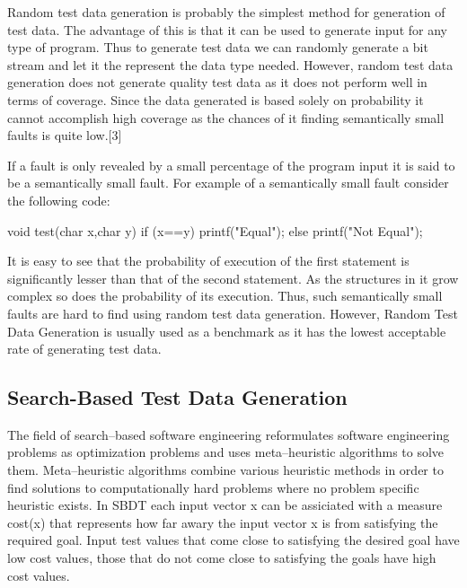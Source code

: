 Random test data generation is probably the simplest method for generation of test data. The advantage of this is that it can be used to generate input for any type of program. Thus to generate test data we can randomly generate a bit stream and let it the represent the data type needed. However, random test data generation does not generate quality test data as it does not perform well in terms of coverage. Since the data generated is based solely on probability it cannot accomplish high coverage as the chances of it finding semantically small faults is quite low.[3]

If a fault is only revealed by a small percentage of the program input it is said to be a semantically small fault. For example of a semantically small fault consider the following code:

void test(char x,char y) {
    if (x==y)
        printf("Equal");
    else
        printf("Not Equal");
}

It is easy to see that the probability of execution of the first statement is significantly lesser than that of the second statement. As the structures in it grow complex so does the probability of its execution. Thus, such semantically small faults are hard to find using random test data generation. However, Random Test Data Generation is usually used as a benchmark as it has the lowest acceptable rate of generating test data.

\subsection{Search-Based Test Data Generation}
The field of search–based software engineering reformulates software engineering problems as optimization problems and uses meta–heuristic algorithms to solve them. Meta–heuristic algorithms combine various heuristic methods in order to find solutions to computationally hard problems where no problem specific heuristic exists. In SBDT each input vector x can be assiciated with a measure cost(x) that represents how far awary the input vector x is from satisfying the required goal. Input test values that come close to satisfying the desired goal have low cost values, those that do not come close to satisfying the goals have high cost values. 

